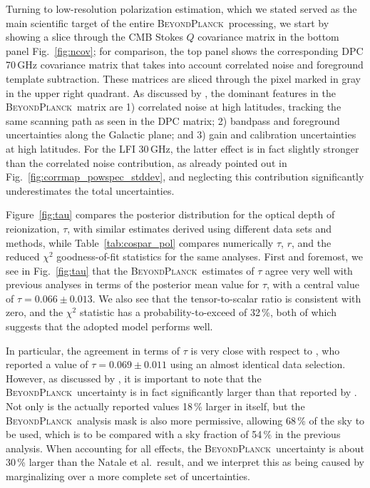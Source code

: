 \documentclass[twocolumn]{aa}
\newcommand{\BP}{\textsc{BeyondPlanck}}
\begin{document}
Turning to low-resolution polarization estimation, which we stated
served as the main scientific target of the entire \BP\ processing, we
start by showing a slice through the CMB Stokes $Q$ covariance matrix
in the bottom panel Fig.~\ref{fig:ncov}; for comparison, the top panel
shows the corresponding DPC 70\,GHz covariance matrix that takes into
account correlated noise and foreground template subtraction. These
matrices are sliced through the pixel marked in gray in the upper
right quadrant. As discussed by \citet{bp11}, the dominant features in
the \BP\ matrix are 1) correlated noise at high latitudes, tracking
the same scanning path as seen in the DPC matrix; 2) bandpass and
foreground uncertainties along the Galactic plane; and 3) gain and
calibration uncertainties at high latitudes. For the LFI 30\,GHz, the
latter effect is in fact slightly stronger than the correlated noise
contribution, as already pointed out in
Fig.~\ref{fig:corrmap_powspec_stddev}, and neglecting this
contribution significantly underestimates the total uncertainties.

Figure~\ref{fig:tau} compares the posterior distribution for the
optical depth of reionization, $\tau$, with similar estimates derived
using different data sets and methods, while
Table~\ref{tab:cospar_pol} compares numerically $\tau$, $r$, and the
reduced $\chi^2$ goodness-of-fit statistics for the same
analyses. First and foremost, we see in Fig.~\ref{fig:tau} that the
\BP\ estimates of $\tau$ agree very well with previous analyses in
terms of the posterior mean value for $\tau$, with a central value of
$\tau=0.066\pm0.013$. We also see that the tensor-to-scalar ratio is
consistent with zero, and the $\chi^2$ statistic has a
probability-to-exceed of 32\,\%, both of which suggests that the
adopted model performs well.

In particular, the agreement in terms of $\tau$ is very close with
respect to \citet{natale:2020}, who reported a value of
$\tau=0.069\pm0.011$ using an almost identical data
selection. However, as discussed by \citet{bp12}, it is important to
note that the \BP\ uncertainty is in fact significantly larger than
that reported by \citet{natale:2020}. Not only is the actually
reported values 18\,\% larger in itself, but the \BP\ analysis mask is
also more permissive, allowing 68\,\% of the sky to be used, which is
to be compared with a sky fraction of 54\,\% in the previous
analysis. When accounting for all effects, the \BP\ uncertainty is
about 30\,\% larger than the Natale et al.\ result, and we interpret
this as being caused by marginalizing over a more complete set of
uncertainties.
\end{document}
